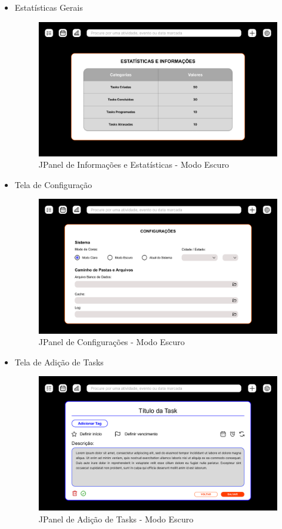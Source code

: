 \documentclass[a4paper,12pt]{article}
\begin{document}
\begin{itemize}
	\item Estatísticas Gerais
	\begin{figure}[H]
		\centering
		\includegraphics[scale=0.20]{prototypes/dark/Stats Panel Window.png}
		\caption{JPanel de Informações e Estatísticas - Modo Escuro}
	\end{figure}

	\item Tela de Configuração
	\begin{figure}[H]
		\centering
		\includegraphics[scale=0.20]{prototypes/dark/Config Panel Window.png}
		\caption{JPanel de Configurações - Modo Escuro}
	\end{figure}

	\item Tela de Adição de Tasks
	\begin{figure}[H]
		\centering
		\includegraphics[scale=0.20]{prototypes/dark/Add Task Panel Window.png}
		\caption{JPanel de Adição de Tasks - Modo Escuro}
	\end{figure}


\end{itemize}
\end{document}
